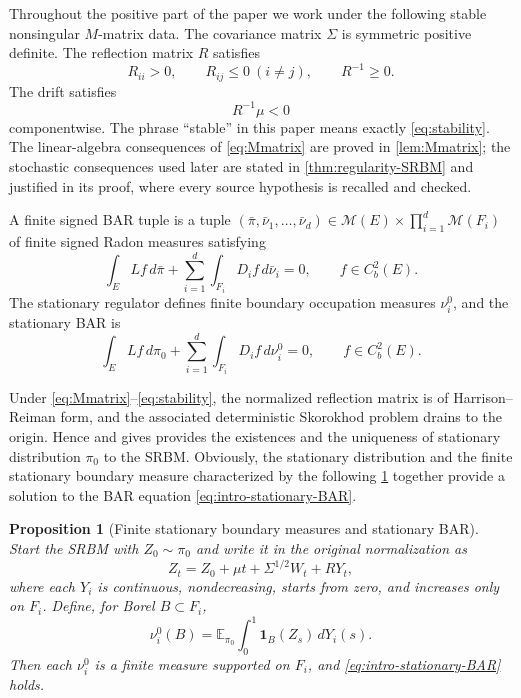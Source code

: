 \documentclass[aihp]{imsart}
\numberwithin{equation}{section}
\theoremstyle{plain}
\newtheorem{proposition}[proposition]{Proposition}
\theoremstyle{definition}
\newcommand{\cM}{\mathcal M}
\newcommand{\1}{\mathbf 1}
\begin{document}
\label{ass:HR}
Throughout the positive part of the paper we work under the following stable nonsingular $M$-matrix data. The covariance matrix $\Sigma$ is symmetric positive definite. The reflection matrix $R$ satisfies
\begin{equation}\label{eq:Mmatrix}
 R_{ii}>0,\qquad R_{ij}\le0\ (i\ne j),\qquad R^{-1}\ge0.
\end{equation}
The drift satisfies
\begin{equation}\label{eq:stability}
 R^{-1}\mu<0
\end{equation}
componentwise.
The phrase ``stable'' in this paper means exactly \eqref{eq:stability}. The linear-algebra consequences of \eqref{eq:Mmatrix} are proved in \cref{lem:Mmatrix}; the stochastic consequences used later are stated in \cref{thm:regularity-SRBM} and justified in its proof, where every source hypothesis is recalled and checked.

\label{def:signed-BAR}

A finite signed BAR tuple is a tuple $(\bar\pi,\bar\nu_1,\ldots,\bar\nu_d)\in\cM(E)\times\prod_{i=1}^d\cM(F_i)$ of finite signed Radon measures satisfying
\begin{equation}\label{eq:signed-BAR}
 \int_E Lf\,d\bar\pi+
 \sum_{i=1}^d\int_{F_i}D_i f\,d\bar\nu_i=0,
 \qquad f\in C_b^2(E).
\end{equation}
The stationary regulator defines finite boundary occupation measures $\nu_i^0$, and the stationary BAR is
\begin{equation}\label{eq:intro-stationary-BAR}
 \int_E Lf\,d\pi_0+\sum_{i=1}^d\int_{F_i}D_i f\,d\nu_i^0=0,
 \qquad f\in C_b^2(E).
\end{equation}

Under \eqref{eq:Mmatrix}--\eqref{eq:stability}, the normalized reflection matrix
is of Harrison--Reiman form, and the associated deterministic Skorokhod problem
drains to the origin.  Hence \cite[Theorem~2.6]{DupuisWilliams1994} and \cite[Theorem~3.5]{LipshutzRamanan2021} gives provides the existences and the uniqueness of stationary distribution \(\pi_0\) to the SRBM. Obviously, the stationary distribution and the finite stationary boundary measure characterized by the following \cref{prop:stationary-BAR} together provide a solution to the BAR equation \eqref{eq:intro-stationary-BAR}.

\begin{proposition}[Finite stationary boundary measures and stationary BAR]\label{prop:stationary-BAR}
Start the SRBM with $Z_0\sim\pi_0$ and write it in the original normalization as
\begin{equation}\label{eq:SRBM-decomposition}
 Z_t=Z_0+\mu t+\Sigma^{1/2}W_t+RY_t,
\end{equation}
where each $Y_i$ is continuous, nondecreasing, starts from zero, and increases only on $F_i$. Define, for Borel $B\subset F_i$,
\begin{equation}\label{eq:stationary-boundary-measure}
 \nu_i^0(B)=\mathbb E_{\pi_0}\int_0^1\mathbf 1_B(Z_s)\,dY_i(s).
\end{equation}
Then each $\nu_i^0$ is a finite measure supported on $F_i$, and \eqref{eq:intro-stationary-BAR} holds.
\end{proposition}
\end{document}
